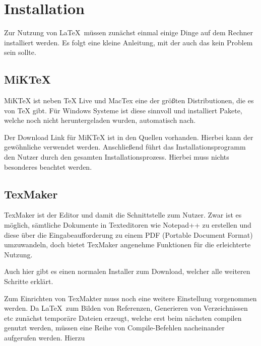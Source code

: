 \chapter{Installation}
\label{ch:installation}
Zur Nutzung von \LaTeX\ müssen zunächst einmal einige Dinge auf dem Rechner installiert werden. Es folgt eine kleine Anleitung, mit der auch das kein Problem sein sollte.

\section{MiKTeX}
MiKTeX ist neben TeX Live und MacTex eine der größten Distributionen, die es von TeX gibt. Für Windows Systeme ist diese sinnvoll und installiert Pakete, welche noch nicht heruntergeladen wurden, automatisch nach.

Der Download Link für MiKTeX ist in den Quellen vorhanden.\autocite[Vgl.][]{miktex} Hierbei kann der gewöhnliche  verwendet werden. Anschließend führt das Installationsprogramm den Nutzer durch den gesamten Installationsprozess. Hierbei muss nichts besonderes beachtet werden.

\section{TexMaker}
TexMaker ist der Editor und damit die Schnittstelle zum Nutzer. Zwar ist es möglich, sämtliche Dokumente in Texteditoren wie Notepad++ zu erstellen und diese über die Eingabeaufforderung zu einem PDF (Portable Document Format) umzuwandeln, doch bietet TexMaker angenehme Funktionen für die erleichterte Nutzung.

Auch hier gibt es einen normalen Installer zum Download, welcher alle weiteren Schritte erklärt.\autocite[Vgl.][]{texmaker}

Zum Einrichten von TexMakter muss noch eine weitere Einstellung vorgenommen werden. Da \LaTeX\ zum Bilden von Referenzen, Generieren von Verzeichnissen etc zunächst temporäre Dateien erzeugt, welche erst beim nächsten compilen genutzt werden, müssen eine Reihe von Compile-Befehlen nacheinander aufgerufen werden. Hierzu 